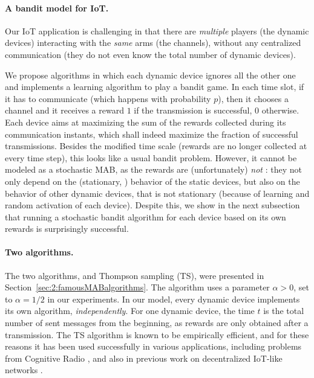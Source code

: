 \paragraph{A bandit model for IoT.}

Our IoT application is challenging in that there are \emph{multiple} players (the dynamic devices) interacting with the \emph{same} arms (the channels), without any centralized communication (they do not even know the total number of dynamic devices).

We propose algorithms in which each dynamic device ignores all the other one and
implements a learning algorithm to play a bandit game.
%
In each time slot, if it has to communicate (which happens with probability $p$), then it chooses a channel and it receives a reward $1$ if the transmission is successful, $0$ otherwise.
Each device aims at maximizing the sum of the rewards collected during its communication instants, which shall indeed maximize the fraction of successful transmissions. Besides the modified time scale (rewards are no longer collected at every time step), this looks like a usual bandit problem.
However, it cannot be modeled as a stochastic MAB, as the rewards are (unfortunately) \emph{not} \iid: they not only depend on the (stationary, \iid) behavior of the static devices, but also on the behavior of other dynamic devices, that is not stationary (because of learning and random activation of each device).
%
Despite this, we show in the next subsection that running a stochastic bandit algorithm for each device based on its own rewards is surprisingly successful.

\paragraph{Two algorithms.}

The two algorithms, \UCB{} and Thompson sampling (TS), were presented in Section~\ref{sec:2:famousMABalgorithms}.
The \UCB{} algorithm uses a parameter $\alpha > 0$, set to $\alpha = 1/2$ in our experiments.
%
In our model, every dynamic device implements its own algorithm, \emph{independently}.
For one dynamic device, the time $t$ is the total number of sent messages from the beginning, as rewards are only obtained after a transmission.
%
The TS algorithm
is known to be empirically efficient, and for these reasons it has been used successfully in various applications, including problems from Cognitive Radio \cite{Toldov16,Mitton16}, and also in previous work on decentralized IoT-like networks \cite{Darak16}.


